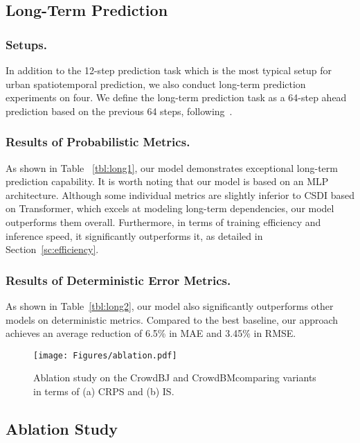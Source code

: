 \subsection{Long-Term Prediction}
\subsubsection*{\textbf{Setups.}}
In addition to the 12-step prediction task which is the most typical setup for urban spatiotemporal prediction, we also conduct long-term prediction experiments on four. We define the long-term prediction task as a 64-step ahead prediction based on the previous 64 steps, following~\cite{yuan2024unist,jin2023time,nie2022time}.

\subsubsection*{\textbf{Results of Probabilistic Metrics.}} As shown in Table ~\ref{tbl:long1}, our model demonstrates exceptional long-term prediction capability. It is worth noting that our model is based on an MLP architecture. Although some individual metrics are slightly inferior to CSDI based on Transformer, which excels at modeling long-term dependencies, our model outperforms them overall. Furthermore, in terms of training efficiency and inference speed, it significantly outperforms it, as detailed in Section~\ref{sc:efficiency}.

\subsubsection*{\textbf{Results of Deterministic Error Metrics.}} As shown in Table~\ref{tbl:long2}, our model also significantly outperforms other models on deterministic metrics. Compared to the best baseline, our approach achieves an average reduction of 6.5\% in MAE and 3.45\% in RMSE.


\begin{figure}[t]
    \centering
    \texttt{[image: Figures/ablation.pdf]}
    \caption{Ablation study on the CrowdBJ and CrowdBMcomparing variants in terms of (a) CRPS and (b) IS.}
    \label{fig:ablation}
    \vspace{-3mm}
\end{figure}


\subsection{Ablation Study}



